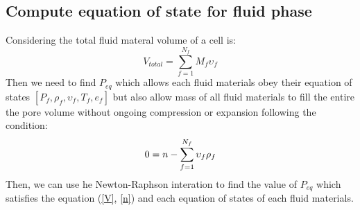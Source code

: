 \documentclass[preprint,12pt]{elsarticle}
\begin{document}
\subsection{\textsf{Compute equation of state for fluid phase}}
Considering the total fluid materal volume of a cell is:
%
%
\begin{equation}
\label{V}
    V_{total} = \sum_{f=1}^{N_f} M_f \upsilon_f 
\end{equation}
%
%
Then we need to find $P_{eq}$ which allows each fluid materials obey their equation of states $[P_f, \rho_f, \upsilon_f, T_f, e_f]$ but also allow mass of all fluid materials to fill the entire the pore volume without ongoing compression or expansion following the condition:
%
%
\begin{equation}
    0 = n - \sum_{f=1}^{N_f} \upsilon_f \rho_f\\
\label{n}
\end{equation}
%
%
Then, we can use he Newton-Raphson interation to find the value of $P_{eq}$ which satisfies the equation (\ref{V}, \ref{n}) and each equation of states of each fluid materials.
\end{document}
